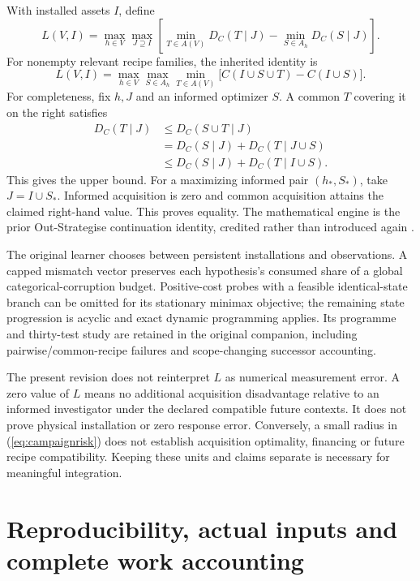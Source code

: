 \documentclass[11pt,letterpaper]{article}
\theoremstyle{definition}\newtheorem{definition}[theorem]{Definition}
\theoremstyle{remark}\newtheorem{remark}[theorem]{Remark}
\begin{document}
With installed assets $I$, define
\begin{equation}
 L(V,I)=\max_{h\in V}\max_{J\supseteq I}
 \left[\min_{T\in A(V)}D_C(T\mid J)-\min_{S\in A_h}D_C(S\mid J)\right].
\end{equation}
For nonempty relevant recipe families, the inherited identity is
\begin{equation}
 L(V,I)=\max_{h\in V}\max_{S\in A_h}\min_{T\in A(V)}
 \big[C(I\cup S\cup T)-C(I\cup S)\big].
 \label{eq:inherited}
\end{equation}
For completeness, fix $h,J$ and an informed optimizer $S$. A common $T$ covering it on the right satisfies
\begin{align*}
 D_C(T\mid J)&\le D_C(S\cup T\mid J)\\
 &=D_C(S\mid J)+D_C(T\mid J\cup S)\\
 &\le D_C(S\mid J)+D_C(T\mid I\cup S).
\end{align*}
This gives the upper bound. For a maximizing informed pair $(h_*,S_*)$, take $J=I\cup S_*$. Informed acquisition is zero and common acquisition attains the claimed right-hand value. This proves equality. The mathematical engine is the prior Out-Strategise continuation identity, credited rather than introduced again \cite{strategise,original}.

The original learner chooses between persistent installations and observations. A capped mismatch vector preserves each hypothesis's consumed share of a global categorical-corruption budget. Positive-cost probes with a feasible identical-state branch can be omitted for its stationary minimax objective; the remaining state progression is acyclic and exact dynamic programming applies. Its programme and thirty-test study are retained in the original companion, including pairwise/common-recipe failures and scope-changing successor accounting.

The present revision does not reinterpret $L$ as numerical measurement error. A zero value of $L$ means no additional acquisition disadvantage relative to an informed investigator under the declared compatible future contexts. It does not prove physical installation or zero response error. Conversely, a small radius in (\ref{eq:campaignrisk}) does not establish acquisition optimality, financing or future recipe compatibility. Keeping these units and claims separate is necessary for meaningful integration.

\section{Reproducibility, actual inputs and complete work accounting}
\label{app:reproduce}
\end{document}
